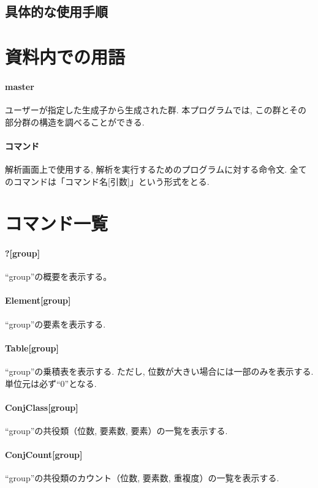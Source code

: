 \documentclass[11pt, a4paper]{jsarticle}
\begin{document}
\subsection{具体的な使用手順}




\section{資料内での用語}
\paragraph{master}
ユーザーが指定した生成子から生成された群.
本プログラムでは, この群とその部分群の構造を調べることができる.

\paragraph{コマンド}
解析画面上で使用する, 解析を実行するためのプログラムに対する命令文.
全てのコマンドは「コマンド名[引数]」という形式をとる.

\section{コマンド一覧}
\paragraph{?[group]}
``group''の概要を表示する。

\paragraph{Element[group]}
``group''の要素を表示する.

\paragraph{Table[group]}
``group''の乗積表を表示する.
ただし, 位数が大きい場合には一部のみを表示する.
単位元は必ず``0''となる.

\paragraph{ConjClass[group]}
``group''の共役類（位数, 要素数, 要素）の一覧を表示する.

\paragraph{ConjCount[group]}
``group''の共役類のカウント（位数, 要素数, 重複度）の一覧を表示する.
\end{document}
